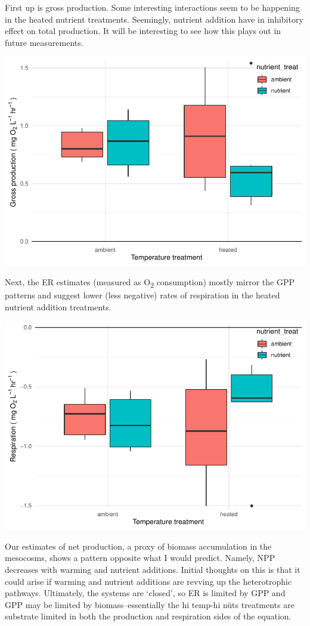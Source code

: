 \documentclass[
]{article}
\begin{document}
First up is gross production. Some interesting interactions seem to be
happening in the heated nutrient treatments. Seemingly, nutrient
addition have in inhibitory effect on total production. It will be
interesting to see how this plays out in future measurements.

\includegraphics{GPP-report_files/figure-latex/gpp boxplots-1.pdf}

Next, the ER estimates (measured as O\textsubscript{2} consumption)
mostly mirror the GPP patterns and suggest lower (less negative) rates
of respiration in the heated nutrient addition treatments.

\includegraphics{GPP-report_files/figure-latex/er boxplots-1.pdf}

Our estimates of net production, a proxy of biomass accumulation in the
mesocosms, shows a pattern opposite what I would predict. Namely, NPP
decreases with warming and nutrient additions. Initial thoughts on this
is that it could arise if warming and nutrient additions are revving up
the heterotrophic pathways. Ultimately, the systems are `closed', so ER
is limited by GPP and GPP may be limited by biomass--essentially the hi
temp-hi nüts treatments are substrate limited in both the production and
respiration sides of the equation.
\end{document}
